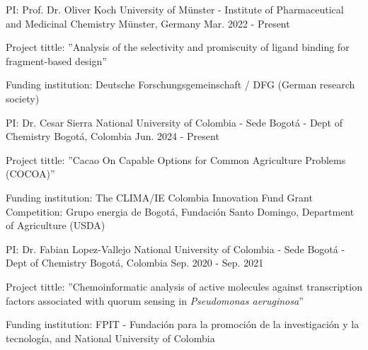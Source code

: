 

\begin{cventries}

  \cventry
    {PI: Prof. Dr. Oliver Koch} %
    {University of Münster - Institute of Pharmaceutical and Medicinal Chemistry} %
    {Münster, Germany} %
    {Mar. 2022 - Present} %
    {
      \begin{cvitems} %
        \item {Project tittle: ''Analysis of the selectivity and promiscuity of ligand binding for fragment-based design”}
        \item {Funding institution: Deutsche Forschungsgemeinschaft / DFG (German research society)}
      \end{cvitems}
    }

  \cventry
    {PI: Dr. Cesar Sierra} %
    {National University of Colombia - Sede Bogotá - Dept of Chemistry} %
    {Bogotá, Colombia} %
    {Jun. 2024 - Present} %
    {
      \begin{cvitems} %
        \item {Project tittle: ''Cacao On Capable Options for Common Agriculture Problems (COCOA)”}
        \item {Funding institution: The CLIMA/IE Colombia Innovation Fund Grant Competition: Grupo energia de Bogotá, Fundación Santo Domingo, Department of Agriculture (USDA)}
      \end{cvitems}
    }

  \cventry
    {PI: Dr. Fabian Lopez-Vallejo} %
    {National University of Colombia - Sede Bogotá - Dept of Chemistry} %
    {Bogotá, Colombia} %
    {Sep. 2020 - Sep. 2021} %
    {
      \begin{cvitems} %
        \item {Project tittle: ''Chemoinformatic analysis of active molecules against transcription factors associated with quorum sensing in \textit{Pseudomonas aeruginosa}”}
        \item {Funding institution: FPIT - Fundación para la promoción de la investigación y la tecnología, and National University of Colombia}
      \end{cvitems}
    }


\end{cventries}
